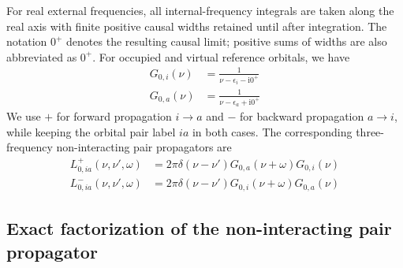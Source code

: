 \documentclass[aip,jcp,reprint,noshowkeys,superscriptaddress]{revtex4-1}
\newcommand{\eps}{\epsilon}
\newcommand{\ii}{\mathrm{i}}
\begin{document}
For real external frequencies, all internal-frequency integrals are taken
along the real axis with finite positive causal widths retained until after
integration. The notation $0^+$ denotes the resulting causal limit;
positive sums of widths are also abbreviated as $0^+$.
For occupied and virtual reference orbitals, we have
\begin{align}
	G_{0,i}(\nu)
	&=
	\frac{1}{\nu-\eps_i-\ii0^+}
	\\
	G_{0,a}(\nu)
	&=
	\frac{1}{\nu-\eps_a+\ii0^+}
	\label{eq:G0}
\end{align}
We use $+$ for forward propagation $i\to a$ and $-$ for backward propagation
$a\to i$, while keeping the orbital pair label $ia$ in both cases.
The corresponding three-frequency non-interacting pair propagators are
\begin{align}
	L_{0,ia}^{+}(\nu,\nu',\omega)
	&=
	2\pi\delta(\nu-\nu')
	G_{0,a}(\nu+\omega) G_{0,i}(\nu)
	\label{eq:L0_three_frequency_plus}
	\\
	L_{0,ia}^{-}(\nu,\nu',\omega)
	&=
	2\pi\delta(\nu-\nu')
	G_{0,i}(\nu+\omega)G_{0,a}(\nu)
	\label{eq:L0_three_frequency_minus}
\end{align}

\subsection{Exact factorization of the non-interacting pair propagator}
\end{document}
